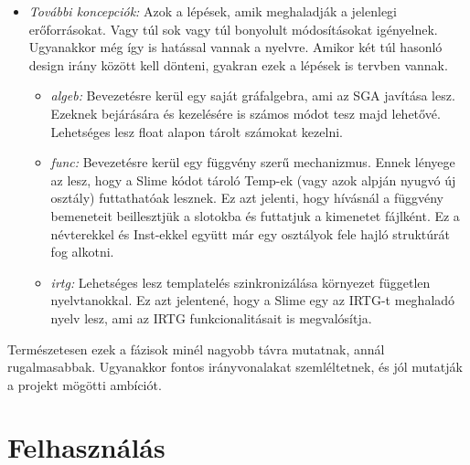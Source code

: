 {\begin{itemize}
\begin{itemize}
\item \emph{logic:}
Bevezetésre kerülnek az alap vezérlési elemek.
If-else helyett a kotlinos when struktőrákból fog kiindulni.
Az iterátorokat tovább fejlesztve az alapvető ciklusok minden típusát tartalmazni fogja.
A tároláshoz is be lesznek vezetve új Cont típusok.
\end{itemize}

\item \emph{További koncepciók:}
Azok a lépések, amik meghaladják a jelenlegi erőforrásokat.
Vagy túl sok vagy túl bonyolult módosításokat igényelnek.
Ugyanakkor még így is hatással vannak a nyelvre.
Amikor két túl hasonló design irány között kell dönteni, gyakran ezek a lépések is tervben vannak.
\begin{itemize}
\item \emph{algeb:}
Bevezetésre kerül egy saját gráfalgebra, ami az SGA javítása lesz.
Ezeknek bejárására és kezelésére is számos módot tesz majd lehetővé.
Lehetséges lesz float alapon tárolt számokat kezelni.
\item \emph{func:}
Bevezetésre kerül egy függvény szerű mechanizmus.
Ennek lényege az lesz, hogy a Slime kódot tároló Temp-ek (vagy azok alpján nyugvó új osztály) futtathatóak lesznek.
Ez azt jelenti, hogy hívásnál a függvény bemeneteit beillesztjük a slotokba és futtatjuk a kimenetet fájlként.
Ez a névterekkel és Inst-ekkel együtt már egy osztályok fele hajló struktúrát fog alkotni.
\item \emph{irtg:}
Lehetséges lesz templatelés szinkronizálása környezet független nyelvtanokkal.
Ez azt jelentené, hogy a Slime egy az IRTG-t meghaladó nyelv lesz, ami az IRTG funkcionalitásait is megvalósítja.
\end{itemize}

\end{itemize}

Természetesen ezek a fázisok minél nagyobb távra mutatnak, annál rugalmasabbak.
Ugyanakkor fontos irányvonalakat szemléltetnek, és jól mutatják a projekt mögötti ambíciót.



\section{Felhasználás}

}
